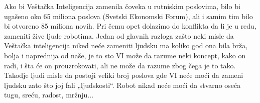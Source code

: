\documentclass[a4paper]{article}
\begin{document}
Ako bi Veštačka Inteligencija zamenila čoveka u rutniskim poslovima, bilo bi ugašeno oko 65 miliona poslova (Svetski Ekonomski Forum), ali i samim tim bilo bi otvoreno 85 miliona novih. Pri čemu opet dolazimo do konflikta da li je u redu, zameniti žive ljude robotima. Jedan od glavnih razloga zašto neki misle da Veštačka inteligencija niked neće zameniti ljudsku ma koliko god ona bila brža, bolja i naprednija od naše, je to sto VI može da razume neki koncept, kako on radi, i šta će on prouzrokovati, ali ne može da razume zbog čega je to tako. Takodje ljudi misle da postoji veliki broj poslova gde VI neće moći da zameni ljudsku zato što joj fali „ljudskosti“. Robot nikad neće moći da stvarno oseća tugu, sreću, radost, mržnju...
\end{document}
